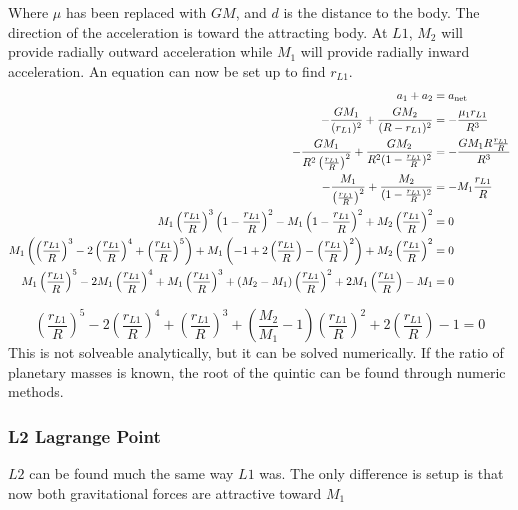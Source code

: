 \documentclass[../basicOrbitalDynamics.tex]{subfiles}
\begin{document}
Where $\mu$ has been replaced with $GM$, and $d$ is the distance to the body. The direction of the acceleration is toward the attracting body. At $L1$, $M_2$ will provide radially outward acceleration while $M_1$ will provide radially inward acceleration. An equation can now be set up to find $r_{L1}$.
\begin{align*}
    a_1+a_2&={a}_\text{net}\\
    -\frac{GM_1}{(r_{L1})^2}+\frac{GM_2}{(R-r_{L1})^2} &= -\frac{\mu_1 r_{L1}}{R^3}\\
    -\frac{GM_1}{R^2\left(\frac{r_{L1}}{R}\right)^2}+\frac{GM_2}{R^2(1-\frac{r_{L1}}{R})^2} &= -\frac{GM_1 R\frac{r_{L1}}{R}}{R^3}\\
    -\frac{M_1}{\left(\frac{r_{L1}}{R}\right)^2}+\frac{M_2}{(1-\frac{r_{L1}}{R})^2} &= -M_1\frac{r_{L1}}{R}\\
    M_1\left(\frac{r_{L1}}{R}\right)^3\left(1-\frac{r_{L1}}{R}\right)^2-M_1\left(1-\frac{r_{L1}}{R}\right)^2+M_2\left(\frac{r_{L1}}{R}\right)^2 &= 0\\
    M_1\left(\left(\frac{r_{L1}}{R}\right)^3-2\left(\frac{r_{L1}}{R}\right)^4+\left(\frac{r_{L1}}{R}\right)^5\right)+M_1\left(-1+2\left(\frac{r_{L1}}{R}\right)-\left(\frac{r_{L1}}{R}\right)^2\right)+M_2\left(\frac{r_{L1}}{R}\right)^2 &= 0\\
    M_1\left(\frac{r_{L1}}{R}\right)^5-2M_1\left(\frac{r_{L1}}{R}\right)^4+M_1\left(\frac{r_{L1}}{R}\right)^3+(M_2-M_1)\left(\frac{r_{L1}}{R}\right)^2+2M_1\left(\frac{r_{L1}}{R}\right)-M_1&= 0\\
\end{align*}

\begin{equation}\label{L1 Equation}
    \left(\frac{r_{L1}}{R}\right)^5-2\left(\frac{r_{L1}}{R}\right)^4+\left(\frac{r_{L1}}{R}\right)^3+\left(\frac{M_2}{M_1}-1\right)\left(\frac{r_{L1}}{R}\right)^2+2\left(\frac{r_{L1}}{R}\right)-1= 0
\end{equation}
This is not solveable analytically, but it can be solved numerically. If the ratio of planetary masses is known, the root of the quintic can be found through numeric methods. 

\subsubsection{L2 Lagrange Point}

$L2$ can be found much the same way $L1$ was. The only difference is setup is that now both gravitational forces are attractive toward $M_1$
\end{document}

